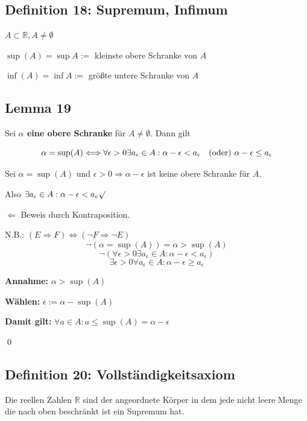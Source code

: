 \documentclass[fleqn]{scrbook}
\newcommand{\qq}[1]{\glqq #1\grqq}
\renewenvironment{proof}{{\bfseries Beweis }}{\qed}
\begin{document}
\subsection{Definition 18: Supremum, Infimum}

$A \subset \mathbb{R}, A \neq \emptyset$

$\sup(A)=\sup A := $ kleinste obere Schranke von $A$

$\inf(A)=\inf A := $ größte untere Schranke von $A$

\subsection{Lemma 19}

Sei \textbf{$\alpha$ eine obere Schranke} für $A \neq \emptyset$. Dann gilt

\[\alpha = \sup(A) \Longleftrightarrow \forall \epsilon > 0 \exists a_{\epsilon} \in A : \alpha - \epsilon < a_{\epsilon} \text{\quad(oder) } \alpha - \epsilon \leq a_{\epsilon}\]

\begin{proof}

Sei $\alpha = \sup(A)$ und $\epsilon > 0 \Longrightarrow \alpha - \epsilon$ ist keine obere Schranke für $A$.

Also $\exists a_{\epsilon} \in A: \alpha -\epsilon < a_e\surd$

\qq{$\Longleftarrow$} Beweis durch Kontraposition.

N.B.: $(E \Longrightarrow F) \Longleftrightarrow (\lnot F \Longrightarrow \lnot E)$
\[\lnot (\alpha = \sup(A))= \alpha > \sup(A) \]
\[\lnot (\forall \epsilon > 0 \exists a_{\epsilon} \in A:\alpha -\epsilon < a_{\epsilon}) \]
\[\exists \epsilon > 0 \boxed{\forall a_{\epsilon} \in A:\alpha -\epsilon \geq a_{\epsilon}}\]

\textbf{Annahme:} $\alpha > \sup(A)$

\textbf{Wählen:} $\epsilon:=\alpha-\sup(A)$

\textbf{Damit gilt:} $\forall a \in A : a \leq \sup(A) = \alpha - \epsilon$  

\end{proof}

\subsection{Definition 20: Vollständigkeitsaxiom}

Die reellen Zahlen $\mathbb{R}$ sind der angeordnete Körper in dem jede nicht leere Menge die nach oben beschränkt ist ein Supremum hat.
\end{document}
